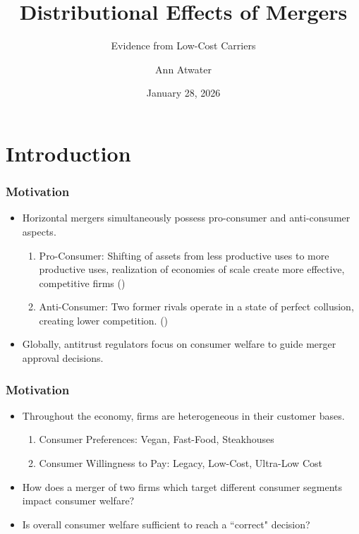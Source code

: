 \documentclass[xcolor=dvipsnames]{beamer}
\author{Ann Atwater}
\institute{University of Florida}
\title{Distributional Effects of Mergers}
\subtitle{Evidence from Low-Cost Carriers}
\date{January 28, 2026}
\begin{document}
	\section{Introduction}
	\frame{\titlepage}
        \begin{frame}
        \frametitle{Motivation}
        \begin{itemize}
            \item Horizontal mergers simultaneously possess pro-consumer and anti-consumer aspects.
            \begin{enumerate}
                \item Pro-Consumer: Shifting of assets from less productive uses to more productive uses, realization of economies of scale create more effective, competitive firms (\cite{williamson_economies_1968, farrell_horizontal_1990, kaplow_improving_2025})
                \item Anti-Consumer: Two former rivals operate in a state of perfect collusion, creating lower competition. (\cite{stigler_theory_1964})
            \end{enumerate}
            \item Globally, antitrust regulators focus on consumer welfare to guide merger approval decisions. 
        \end{itemize}
    \end{frame}

    \begin{frame}
        \frametitle{Motivation}
        \begin{itemize}
         \item Throughout the economy, firms are heterogeneous in their customer bases.
            \begin{enumerate}
                \item Consumer Preferences: Vegan, Fast-Food, Steakhouses 
                \item Consumer Willingness to Pay: Legacy, Low-Cost, Ultra-Low Cost
            \end{enumerate}
                    \item How does a merger of two firms which target different consumer segments impact consumer welfare?
            \item Is overall consumer welfare sufficient to reach a ``correct" decision?

        \end{itemize}
         
    \end{frame}
\end{document}
